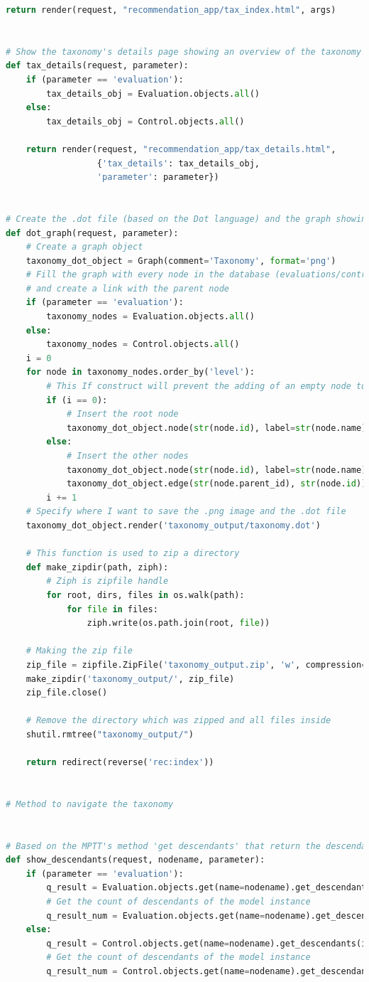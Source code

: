 \begin{lstlisting}[language=Python, caption={Parti principali del codice delle View della soluzione per gestire la navigazione 
	delle tassonomie, quella delle Evaluation e quella dei Controlli}]
	return render(request, "recommendation_app/tax_index.html", args)


# Show the taxonomy's details page showing an overview of the taxonomy
def tax_details(request, parameter):
	if (parameter == 'evaluation'):
		tax_details_obj = Evaluation.objects.all()
	else:
		tax_details_obj = Control.objects.all()

	return render(request, "recommendation_app/tax_details.html",
				  {'tax_details': tax_details_obj,
				  'parameter': parameter})


# Create the .dot file (based on the Dot language) and the graph showing the taxonomy in .png format
def dot_graph(request, parameter):
	# Create a graph object
	taxonomy_dot_object = Graph(comment='Taxonomy', format='png')
	# Fill the graph with every node in the database (evaluations/controls node and categories nodes), 
	# and create a link with the parent node
	if (parameter == 'evaluation'):
		taxonomy_nodes = Evaluation.objects.all()
	else:
		taxonomy_nodes = Control.objects.all()
	i = 0
	for node in taxonomy_nodes.order_by('level'):
		# This If construct will prevent the adding of an empty node to the root node in the graph
		if (i == 0):
			# Insert the root node
			taxonomy_dot_object.node(str(node.id), label=str(node.name))
		else:
			# Insert the other nodes
			taxonomy_dot_object.node(str(node.id), label=str(node.name))
			taxonomy_dot_object.edge(str(node.parent_id), str(node.id))
		i += 1
	# Specify where I want to save the .png image and the .dot file
	taxonomy_dot_object.render('taxonomy_output/taxonomy.dot')

	# This function is used to zip a directory
	def make_zipdir(path, ziph):
		# Ziph is zipfile handle
		for root, dirs, files in os.walk(path):
			for file in files:
				ziph.write(os.path.join(root, file))

	# Making the zip file
	zip_file = zipfile.ZipFile('taxonomy_output.zip', 'w', compression=zipfile.ZIP_DEFLATED)
	make_zipdir('taxonomy_output/', zip_file)
	zip_file.close()

	# Remove the directory which was zipped and all files inside
	shutil.rmtree("taxonomy_output/")

	return redirect(reverse('rec:index'))


# Method to navigate the taxonomy


# Based on the MPTT's method 'get descendants' that return the descendants of a model instance, in tree order
def show_descendants(request, nodename, parameter):
	if (parameter == 'evaluation'):
		q_result = Evaluation.objects.get(name=nodename).get_descendants(include_self=False)
		# Get the count of descendants of the model instance
		q_result_num = Evaluation.objects.get(name=nodename).get_descendant_count()
	else:
		q_result = Control.objects.get(name=nodename).get_descendants(include_self=False)
		# Get the count of descendants of the model instance
		q_result_num = Control.objects.get(name=nodename).get_descendant_count()


\end{lstlisting}

